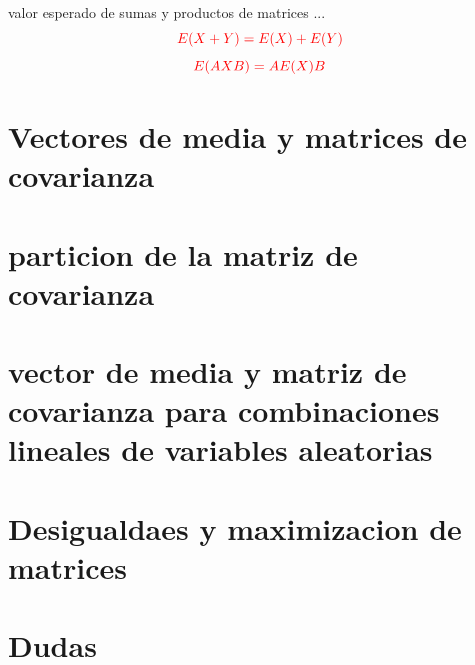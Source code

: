 \documentclass[10pt,a4paper]{article} %
\begin{document}
        \newpage
        valor esperado de sumas y productos de matrices ...
        \begin{equation}
            \color{red} E(X+Y) = E(X) + E(Y) \color{white}
        \end{equation}
        \begin{equation}
            \color{red} E(AXB) =  AE(X)B \color{white}
        \end{equation}



    \section{Vectores de media y matrices de covarianza}
    \section{particion de la matriz de covarianza}
    \section{vector de media y matriz de covarianza para combinaciones lineales de variables aleatorias}
    \section{Desigualdaes y maximizacion de matrices}
    \section{Dudas}









    \nocite{*}
    
    
\end{document}
